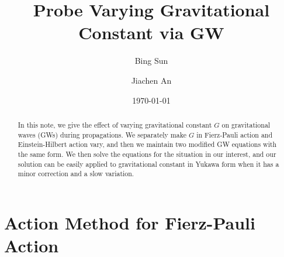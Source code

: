\documentclass[
    jor,
    amsmath,amssymb,preprint,
    superscriptaddress,
]{revtex4-2}
\begin{document}

\title[Probe Varying Gravitational Constant via GW]{Probe Varying Gravitational Constant via GW}%

\author{Bing Sun}
\author{Jiachen An}

\date{\today}%

\begin{abstract}
In this note, we give the effect of varying gravitational constant $G$ on  gravitational waves (GWs) during propagations. We separately make $G$ in Fierz-Pauli action and Einstein-Hilbert action vary, and then we maintain two modified GW equations with the same form. We then solve the equations for the situation in our interest, and our solution can be easily applied to gravitational constant in Yukawa form when it has a minor correction and a slow variation.
\end{abstract}


\maketitle

\section{Action Method for Fierz-Pauli Action}
\end{document}
